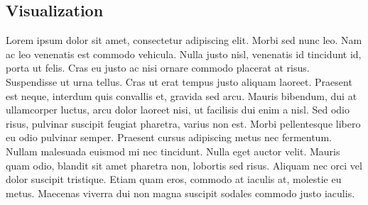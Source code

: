 \subsection{Visualization}
\label{sec:hard_cut_visualization}

Lorem ipsum dolor sit amet, consectetur adipiscing elit. Morbi sed nunc leo. Nam ac leo venenatis est commodo vehicula. Nulla justo nisl, venenatis id tincidunt id, porta ut felis. Cras eu justo ac nisi ornare commodo placerat at risus. Suspendisse ut urna tellus. Cras ut erat tempus justo aliquam laoreet. Praesent est neque, interdum quis convallis et, gravida sed arcu. Mauris bibendum, dui at ullamcorper luctus, arcu dolor laoreet nisi, ut facilisis dui enim a nisl. Sed odio risus, pulvinar suscipit feugiat pharetra, varius non est. Morbi pellentesque libero eu odio pulvinar semper. Praesent cursus adipiscing metus nec fermentum. Nullam malesuada euismod mi nec tincidunt. Nulla eget auctor velit. Mauris quam odio, blandit sit amet pharetra non, lobortis sed risus. Aliquam nec orci vel dolor suscipit tristique. Etiam quam eros, commodo at iaculis at, molestie eu metus. Maecenas viverra dui non magna suscipit sodales commodo justo iaculis.
